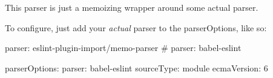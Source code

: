 This parser is just a memoizing wrapper around some actual parser.

To configure, just add your {\itshape actual} parser to the {\ttfamily parser\+Options}, like so\+:


\begin{DoxyCode}
parser: eslint-plugin-import/memo-parser
# parser: babel-eslint

parserOptions:
  parser: babel-eslint
  sourceType: module
  ecmaVersion: 6
\end{DoxyCode}
 